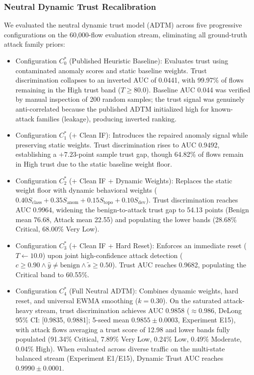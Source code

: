\documentclass[journal,10pt,onecolumn]{IEEEtran}
\begin{document}
\subsubsection{Neutral Dynamic Trust Recalibration}
We evaluated the neutral dynamic trust model (ADTM) across five progressive configurations on the 60,000-flow evaluation stream, eliminating all ground-truth attack family priors:
\begin{itemize}
  \item Configuration $C_0^*$ (Published Heuristic Baseline): Evaluates trust using contaminated anomaly scores and static baseline weights. Trust discrimination collapses to an inverted AUC of 0.0441, with 99.97\% of flows remaining in the High trust band ($T \ge 80.0$). Baseline AUC 0.044 was verified by manual inspection of 200 random samples; the trust signal was genuinely anti-correlated because the published ADTM initialized high for known-attack families (leakage), producing inverted ranking.
  \item Configuration $C_1^*$ (+ Clean IF): Introduces the repaired anomaly signal while preserving static weights. Trust discrimination rises to AUC 0.9492, establishing a $+7.23$-point sample trust gap, though 64.82\% of flows remain in High trust due to the static baseline weight floor.
  \item Configuration $C_2^*$ (+ Clean IF + Dynamic Weights): Replaces the static weight floor with dynamic behavioral weights ($0.40 S_{\text{class}} + 0.35 S_{\text{anom}} + 0.15 S_{\text{topo}} + 0.10 S_{\text{dev}}$). Trust discrimination reaches AUC 0.9964, widening the benign-to-attack trust gap to 54.13 points (Benign mean 76.68, Attack mean 22.55) and populating the lower bands (28.68\% Critical, 68.00\% Very Low).
  \item Configuration $C_3^*$ (+ Clean IF + Hard Reset): Enforces an immediate reset ($T \leftarrow 10.0$) upon joint high-confidence attack detection ($c \ge 0.90 \land \hat{y} \ne \text{benign} \land \tilde{s} \ge 0.50$). Trust AUC reaches 0.9682, populating the Critical band to 60.55\%.
  \item Configuration $C_4^*$ (Full Neutral ADTM): Combines dynamic weights, hard reset, and universal EWMA smoothing ($k = 0.30$). On the saturated attack-heavy stream, trust discrimination achieves AUC 0.9858 ($\approx 0.986$, DeLong 95\% CI: [0.9835, 0.9881]; 5-seed mean $0.9855 \pm 0.0003$, Experiment E15), with attack flows averaging a trust score of 12.98 and lower bands fully populated (91.34\% Critical, 7.89\% Very Low, 0.24\% Low, 0.49\% Moderate, 0.04\% High). When evaluated across diverse traffic on the multi-state balanced stream (Experiment E1/E15), Dynamic Trust AUC reaches $0.9990 \pm 0.0001$.
\end{itemize}
\end{document}
